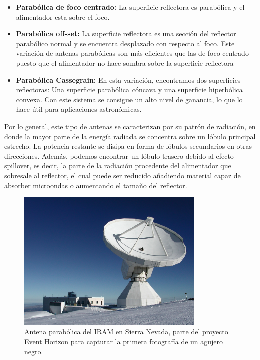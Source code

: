 \begin{itemize}
	\item \textbf{Parabólica de foco centrado: }La superficie reflectora es parabólica y el alimentador esta sobre el foco.
	\item \textbf{Parabólica off-set: }La superficie reflectora es una sección del reflector parabólico normal y se encuentra desplazado con respecto al foco. Este variación de antenas parabólicas son más eficientes que las de foco centrado puesto que el alimentador no hace sombra sobre la superficie reflectora
	\item \textbf{Parabólica Cassegrain: }En esta variación, encontramos dos superficies reflectoras: Una superficie parabólica cóncava y una superficie hiperbólica convexa. Con este sistema se consigue un alto nivel de ganancia, lo que lo hace útil para aplicaciones astronómicas.
\end{itemize}

\par Por lo general, este tipo de antenas se caracterizan por su patrón de radiación, en donde la mayor parte de la energía radiada se concentra sobre un lóbulo principal estrecho. La potencia restante se disipa en forma de lóbulos secundarios en otras direcciones. Además, podemos encontrar un lóbulo trasero debido al efecto spillover, es decir, la parte de la radiación procedente del alimentador que sobresale al reflector, el cual puede ser reducido añadiendo material capaz de absorber microondas o aumentando el tamaño del reflector. 


\begin{figure}[h]
    \centering
        \includegraphics[width=0.8\textwidth]{archivos/parab}
        \caption{Antena parabólica del IRAM en Sierra Nevada, parte del proyecto Event Horizon para capturar la primera fotografía de un agujero negro. \citep{MICIU2019}}
        \label{fig:parabolica}
\end{figure}

